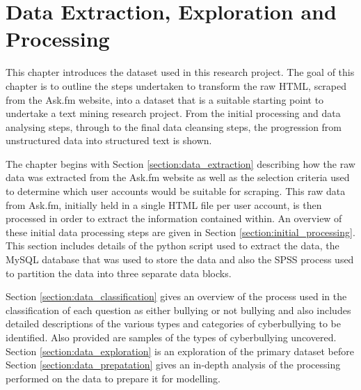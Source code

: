 
\chapter{Data Extraction, Exploration and Processing} %

\label{chapter4} %


This chapter introduces the dataset used in this research project. The goal of this chapter is to outline the steps undertaken to transform the raw HTML, scraped from the Ask.fm website, into a dataset that is a suitable starting point to undertake a text mining research project. From the initial processing and data analysing steps, through to the final data cleansing steps, the progression from unstructured data into structured text is shown. 

The chapter begins with Section \ref{section:data_extraction} describing how the raw data was extracted from the Ask.fm website as well as the selection criteria used to determine which user accounts would be suitable for scraping. This raw data from Ask.fm, initially held in a single HTML file per user account, is then processed in order to extract the information contained within. An overview of these initial data processing steps are given in Section \ref{section:initial_processing}. This section includes details of the python script used to extract the data, the MySQL database that was used to store the data and also the SPSS process used to partition the data into three separate data blocks.

Section \ref{section:data_classification} gives an overview of the process used in the classification of each question as either bullying or not bullying and also includes detailed descriptions of the various types and categories of cyberbullying to be identified. Also provided are samples of the types of cyberbullying uncovered. Section \ref{section:data_exploration} is an exploration of the primary dataset before Section \ref{section:data_prepatation} gives an in-depth analysis of the processing performed on the data to prepare it for modelling. 
